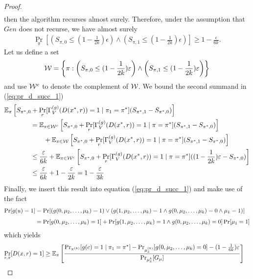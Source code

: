 \begin{proof}
\begin{align}
\end{align}
then the algorithm recurses almost surely.
Therefore, under the assumption that $Gen$ does not recurse, we have almost surely
\begin{align}
\underset{\pi}{\Pr}\left[\left(S_{\pi,0} \leq (1 - \frac{1}{2k})\epsilon\right) \land \left( S_{\pi,1} \leq (1-\frac{1}{2k})\epsilon\right)\right] \geq 1 - \frac{\epsilon}{6k}.
\end{align}
Let us define a set
\begin{align}
  \mathcal{W} = \left\{ \pi :  \left(S_{\pi,0} \leq (1 - \frac{1}{2k})\varepsilon\right) \land \left( S_{\pi,1} \leq (1-\frac{1}{2k})\varepsilon \right) \right\}
\end{align}
and use $\mathcal{W}^c$ to denote the complement of $\mathcal{W}$.
We bound the second summand in (\ref{eq:pr_d_succ_1})
\begin{align}
&\mathbb{E}_{\pi}\left[ S_{\pi^*,0} + \Pr_r [\Gamma_V^{(g)}(D(x^*,r)) = 1 \mid \pi_1 = \pi^*](S_{\pi^*,1} - S_{\pi^*,0}) \right] \notag\\
&\mbox\qquad\qquad = \mathbb{E}_{\pi \in \mathcal{W}^c}\left[ S_{\pi^*,0} + \Pr_r [\Gamma_V^{(g)}(D(x^*,r)) = 1 \mid \pi = \pi^*](S_{\pi^*,1} - S_{\pi^*,0}) \right] \notag\\
&\mbox\qquad\qquad\qquad +  \mathbb{E}_{\pi \in \mathcal{W}}\left[ S_{\pi^*,0} + \Pr_r [\Gamma_V^{(g)}(D(x^*,r)) = 1 \mid \pi = \pi^*](S_{\pi^*,1} - S_{\pi^*,0}) \right] \\
&\mbox\qquad\qquad \leq \frac{\varepsilon}{6k} + \mathbb{E}_{\pi \in \mathcal{W}^c}\left[ S_{\pi^*,0} + \Pr_r [\Gamma_V^{(g)}(D(x^*,r)) = 1 \mid \pi = \pi^*]((1 - \frac{1}{2k})\varepsilon - S_{\pi^*,0}) \right] \\
&\mbox\qquad\qquad \leq \frac{\varepsilon}{6k} + 1 - \frac{\varepsilon}{2k} = 1 - \frac{\varepsilon}{3k}
\end{align}
Finally, we insert this result into equation (\ref{eq:pr_d_succ_1}) and make use of the fact
\begin{align*}
\underset{}{\Pr}[g(u) = 1] &= \underset{}{\Pr}[(g(0, \mu_2, \dots, \mu_k) = 1) \lor ( g(1,\mu_2, \dots, \mu_k) = 1 \land g(0, \mu_2, \dots, \mu_k) = 0 \land \mu_1 = 1)] \notag\\
&= \Pr[g(0,\mu_2, \dots,\mu_k) = 1] + \Pr[g(1,\mu_2,\dots,\mu_k) = 1 \land g(0, \mu_2, \dots, \mu_k) = 0] \Pr[\mu_1 = 1]
\end{align*}
which yields
\begin{align*}
  \underset{r,\pi}{\Pr}[D(x,r) = 1]
&\geq \mathbb{E}_{\pi}\left[\frac{{\Pr}_{\pi^{(k)}}[g(c) = 1 \mid \pi_1 = \pi^*] -
{\Pr}_{\mu_{\delta}^{(k)}}[g(0, \mu_2, \dots, \mu_k) = 0] - (1 - \frac{1}{6k})\epsilon} {{\Pr}_{\mu_{\delta}^{k}}[G_{\mu}]}\right] \notag

\end{align*}
\end{proof}
